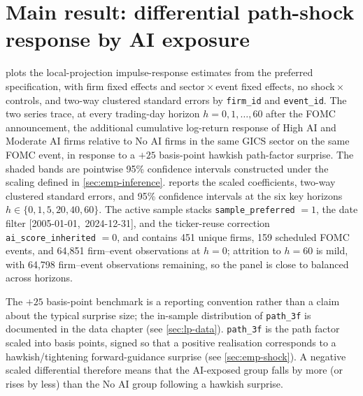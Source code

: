\section{Main result: differential path-shock response by AI exposure}
\label{sec:res-main}

 plots the local-projection impulse-response
estimates from the preferred specification, with firm fixed effects and
sector\,$\times$\,event fixed effects, no shock\,$\times$\,controls, and
two-way clustered standard errors by \texttt{firm\_id} and \texttt{event\_id}.
The two series trace, at every trading-day horizon
$h = 0, 1, \dots, 60$ after the FOMC announcement, the additional
cumulative log-return response of High AI and Moderate AI firms relative
to No AI firms in the same GICS sector on the same FOMC event, in response
to a $+25$ basis-point hawkish path-factor surprise. The shaded bands are
pointwise 95\% confidence intervals constructed under the scaling defined
in \cref{sec:emp-inference}.  reports the
scaled coefficients, two-way clustered standard errors, and 95\%
confidence intervals at the six key horizons $h \in \{0, 1, 5, 20, 40, 60\}$.
The active sample stacks \texttt{sample\_preferred} $= 1$, the date filter
\mbox{[2005-01-01, 2024-12-31]}, and the ticker-reuse correction
\texttt{ai\_score\_inherited} $= 0$, and contains 451 unique firms, 159
scheduled FOMC events, and 64{,}851 firm--event observations at $h = 0$;
attrition to $h = 60$ is mild, with 64{,}798 firm--event observations
remaining, so the panel is close to balanced across horizons.

The $+25$ basis-point benchmark is a reporting convention rather than a
claim about the typical surprise size; the in-sample distribution of
\texttt{path\_3f} is documented in the data chapter (see
\cref{sec:lp-data}). \texttt{path\_3f} is the path factor scaled into
basis points, signed so that a positive realisation corresponds to a
hawkish/tightening forward-guidance surprise (see \cref{sec:emp-shock}).
A negative scaled differential therefore means that the AI-exposed group
falls by more (or rises by less) than the No AI group following a hawkish
surprise.


